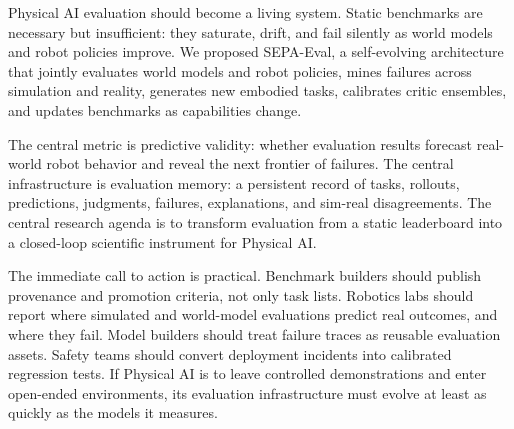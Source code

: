 \documentclass[sigconf,review,anonymous]{acmart}
\newcommand{\system}{SEPA-Eval\xspace}
\begin{document}
Physical AI evaluation should become a living system. Static benchmarks are necessary but insufficient: they saturate, drift, and fail silently as world models and robot policies improve. We proposed \system, a self-evolving architecture that jointly evaluates world models and robot policies, mines failures across simulation and reality, generates new embodied tasks, calibrates critic ensembles, and updates benchmarks as capabilities change.

The central metric is predictive validity: whether evaluation results forecast real-world robot behavior and reveal the next frontier of failures. The central infrastructure is evaluation memory: a persistent record of tasks, rollouts, predictions, judgments, failures, explanations, and sim-real disagreements. The central research agenda is to transform evaluation from a static leaderboard into a closed-loop scientific instrument for Physical AI.

The immediate call to action is practical. Benchmark builders should publish provenance and promotion criteria, not only task lists. Robotics labs should report where simulated and world-model evaluations predict real outcomes, and where they fail. Model builders should treat failure traces as reusable evaluation assets. Safety teams should convert deployment incidents into calibrated regression tests. If Physical AI is to leave controlled demonstrations and enter open-ended environments, its evaluation infrastructure must evolve at least as quickly as the models it measures.

\balance


\end{document}
